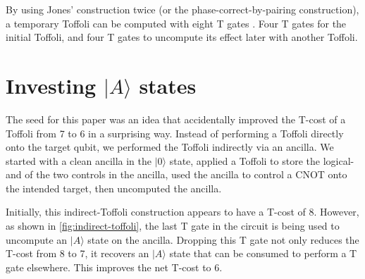 \documentclass[twocolumn,longbibliography]{quantumarticle-customized}
\begin{document}
By using Jones' construction twice (or the phase-correct-by-pairing construction), a temporary Toffoli can be computed with eight T gates \cite{Amy2013}.
Four T gates for the initial Toffoli, and four T gates to uncompute its effect later with another Toffoli.


\section{Investing $|A\rangle$ states}
\label{sec:invest}

The seed for this paper was an idea that accidentally improved the T-cost of a Toffoli from 7 to 6 in a surprising way.
Instead of performing a Toffoli directly onto the target qubit, we performed the Toffoli indirectly via an ancilla.
We started with a clean ancilla in the $|0\rangle$ state, applied a Toffoli to store the logical-and of the two controls in the ancilla, used the ancilla to control a CNOT onto the intended target, then uncomputed the ancilla.

Initially, this indirect-Toffoli construction appears to have a T-cost of 8.
However, as shown in \autoref{fig:indirect-toffoli}, the last T gate in the circuit is being used to uncompute an $|A\rangle$ state on the ancilla.
Dropping this T gate not only reduces the T-cost from 8 to 7, it recovers an $|A\rangle$ state that can be consumed to perform a T gate elsewhere.
This improves the net T-cost to 6.
\end{document}

